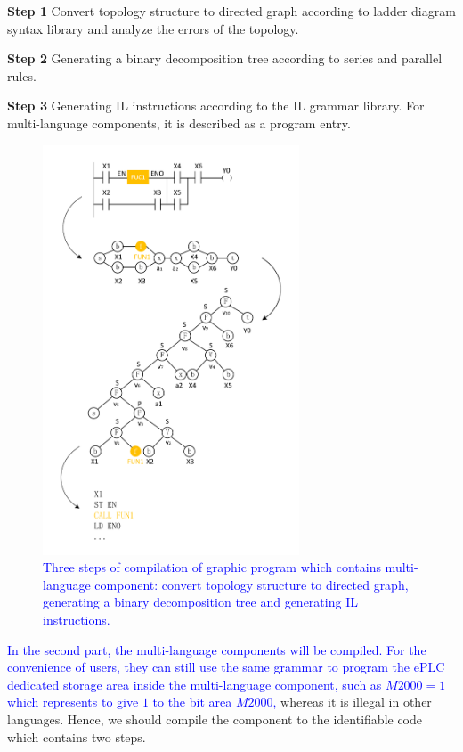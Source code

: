 \documentclass[journal,UTF8]{IEEEtran}
\begin{document}
 \textbf{Step 1} Convert topology structure to directed graph according to ladder diagram syntax library and analyze the errors of the topology.
 	
 \textbf{Step 2} Generating a binary decomposition tree according to series and parallel rules.
 	
 \textbf{Step 3} Generating IL instructions according to the IL grammar library. For multi-language components, it is described as a program entry.
 
 \begin{figure}
 	\centering
 	\includegraphics[width=3in]{fig/Compile.pdf}
 	\caption{\textcolor{blue}{Three steps of compilation of graphic program which contains multi-language component: convert topology structure to directed graph, generating a binary decomposition tree and generating IL instructions.}}
 	\label{fig:Compile}
 \end{figure}
 
 \textcolor{blue}{In the second part, the multi-language components will be compiled. For the convenience of users, they can still use the same grammar to program the ePLC dedicated storage area inside the multi-language component, such as $M2000=1$ which represents to give $1$ to the bit area $M2000$,} whereas it is illegal in other languages. Hence, we should compile the component to the identifiable code which contains two steps.
 	
\end{document}
